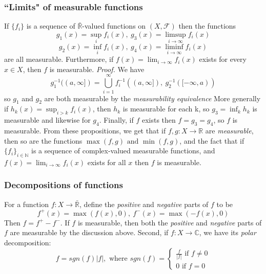 \documentclass{article}
\begin{document}
\subsubsection{``Limits" of measurable functions}
If $\{f_i\}$ is a sequence of $\bar{\mathbb{R}}$-valued functions on $(X,\mathcal{F})$ then the functions 
\[
g_1(x) = \sup_if_i(x), \ g_3(x) = \limsup_{i \to \infty}f_i(x)
\]
\[
g_2(x)= \inf_if_i(x), \ g_4(x) = \liminf_{i\to\infty}f_i(x)
\]
are all measurable. Furthermore, if $f(x) = \lim_{i\to \infty}f_i(x)$ exists for every $x\in X$, then $f$ is measurable. \newline \newline 
\textit{Proof.} \newline \newline
We have 
\[
g_1^{-1}((a, \infty])= \bigcup_{i=1}^{\infty}f_i^{-1}((a,\infty]), \ g_2^{-1}([-\infty,a))
\]
so $g_1$ and $g_2$ are both measurable by the \emph{measurability equivalence}\newline \newline 
More generally  if $h_k(x)= \sup_{i>k }f_i(x)$, then $h_k$ is measurable for each k, so $g_3=\inf_kh_k$ is measurable and likewise for $g_4$. Finally, if $f$ exists then $f=g_3=g_4$, so $f$ is measurable. \newline \newline
From these propositions, we get that if $f,g:X\to \mathbb{R}$ are \emph{measurable}, then so are the functions $\max(f,g) \text{ and } \min(f,g)$, and the fact that if $\{f_i\}_{i\in\mathbb{N}}$ is a sequence of complex-valued measurable functions, and $f(x)=\lim_{i\to \infty}f_i(x)$ exists for all $x$ then $f$ is measurable.
\subsubsection{Decompositions of functions}
For a function $f:X \to \bar{\mathbb{R}}$, define the \emph{positive} and \emph{negative} parts of $f$ to be 
\[
f^+(x)=\max (f(x),0), \ f^-(x)=\max(-f(x),0)
\]
Then $f=f^+-f^-$. If $f$ is measurable, then both the  \emph{positive} and \emph{negative} parts of $f$ are measurable by the discussion above. Second, if $f:X\to \mathbb{C}$, we have its \emph{polar} decomposition:
\[
f= sgn(f)|f|, \text{ where }sgn(f) = \begin{cases}\frac{f}{|f|} \text{ if } f \neq 0 \\0 \text{ if } f = 0
    
\end{cases}
\]
\end{document}
